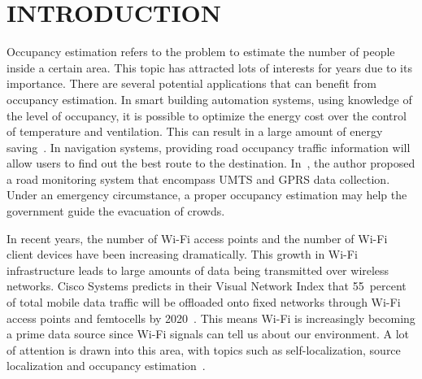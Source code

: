 \chapter[INTRODUCTION]{INTRODUCTION}

Occupancy estimation refers to the problem to estimate the number of people inside a certain area. 
This topic has attracted lots of interests for years due to its importance.
There are several potential applications that can benefit from occupancy estimation.
In smart building automation systems, using knowledge of the level of occupancy, it is possible to optimize the energy cost over the control of temperature and ventilation.
This can result in a large amount of energy saving~\cite{Nguyen2013244,Balaji:2013:SOB:2517351.2517370}.
In navigation systems, providing road occupancy traffic information will allow users to find out the best route to the destination.
In~\cite{5073548}, the author proposed a road monitoring system that encompass UMTS and GPRS data collection.
Under an emergency circumstance, a proper occupancy estimation may help the government guide the evacuation of crowds. 

In recent years, the number of Wi-Fi access points and the number of Wi-Fi client devices have been increasing dramatically.
This growth in Wi-Fi infrastructure leads to large amounts of data being transmitted over wireless networks.
Cisco Systems predicts in their Visual Network Index that 55~percent of total mobile data traffic will be offloaded onto fixed networks through Wi-Fi access points and femtocells by 2020~\cite{CiscoVNI2016}.
This means Wi-Fi is increasingly becoming a prime data source since Wi-Fi signals can tell us about our environment.
A lot of attention is drawn into this area, with topics such as self-localization, source localization and occupancy estimation~\cite{2461394,6197192}.

